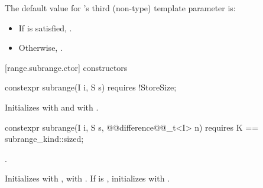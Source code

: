 {\color{oldclr}
\pnum
The default value for 's third (non-type) template parameter is:
\begin{itemize}
\item If  is satisfied, .
\item Otherwise, .
\end{itemize}
} %

[range.subrange.ctor]{ constructors}

%
\begin{itemdecl}
constexpr subrange(I i, S s) requires !StoreSize;
\end{itemdecl}

\begin{itemdescr}
\pnum
\effects Initializes  with  and  with
.
\end{itemdescr}

%
\begin{itemdecl}
constexpr subrange(I i, S s, @@difference@@_t<I> n)
  requires K == subrange_kind::sized;
\end{itemdecl}

\begin{itemdescr}
\pnum
\oldtxt{\requires} \newtxt{\expects}
.

\pnum
\effects Initializes  with ,  with
. If  is , initializes  with
.
\end{itemdescr}

